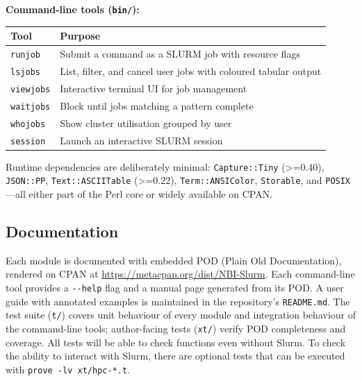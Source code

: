 \documentclass[
]{article}
\newcounter{none} %
\begin{document}
\textbf{Command-line tools (\texttt{bin/}):}

{\def\LTcaptype{none} %
\begin{longtable}[]{@{}
  >{\raggedright\arraybackslash}p{}
  >{\raggedright\arraybackslash}p{}@{}}
\toprule\noalign{}
\begin{minipage}[b]{\linewidth}\raggedright
Tool
\end{minipage} & \begin{minipage}[b]{\linewidth}\raggedright
Purpose
\end{minipage} \\
\midrule\noalign{}
\endhead
\bottomrule\noalign{}
\endlastfoot
\texttt{runjob} & Submit a command as a SLURM job with resource flags \\
\texttt{lsjobs} & List, filter, and cancel user jobs with coloured
tabular output \\
\texttt{viewjobs} & Interactive terminal UI for job management \\
\texttt{waitjobs} & Block until jobs matching a pattern complete \\
\texttt{whojobs} & Show cluster utilisation grouped by user \\
\texttt{session} & Launch an interactive SLURM session \\
\end{longtable}
}

Runtime dependencies are deliberately minimal: \texttt{Capture::Tiny}
(\textgreater=0.40), \texttt{JSON::PP}, \texttt{Text::ASCIITable}
(\textgreater=0.22), \texttt{Term::ANSIColor}, \texttt{Storable}, and
\texttt{POSIX}---all either part of the Perl core or widely available on
CPAN.

\subsection{Documentation}\label{documentation}

Each module is documented with embedded POD (Plain Old Documentation),
rendered on CPAN at \url{https://metacpan.org/dist/NBI-Slurm}. Each
command-line tool provides a \texttt{-\/-help} flag and a manual page
generated from its POD. A user guide with annotated examples is
maintained in the repository's \texttt{README.md}. The test suite
(\texttt{t/}) covers unit behaviour of every module and integration
behaviour of the command-line tools; author-facing tests (\texttt{xt/})
verify POD completeness and coverage. All tests will be able to check
functions even without Slurm. To check the ability to interact with
Slurm, there are optional tests that can be executed with
\texttt{prove\ -lv\ xt/hpc-*.t}.
\end{document}
